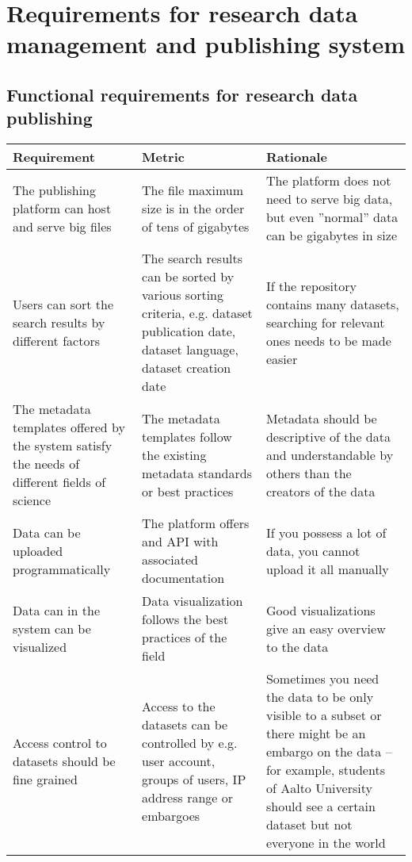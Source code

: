 \chapter{Requirements for research data management and publishing system}
\label{chapter:reqs}

\section{Functional requirements for research data publishing}

\tabcolsep=0.11cm
\begin{tabularx}{\textwidth}{| >{\raggedright}p{3cm} | >{\raggedright}p{3cm} | X |}
    \hline
    \textbf{Requirement} & \textbf{Metric}& \textbf{Rationale} \\
    \hline
    \rowcolor{Gray}
    The publishing platform can host and serve big files    &The file maximum size is in the order of tens of gigabytes & The platform does not need to serve big data, but even ''normal'' data can be gigabytes in size\\
    \hline
    Users can sort the search results by different factors &The search results can be sorted by various sorting criteria, e.g. dataset publication date, dataset language, dataset creation date & If the repository contains many datasets, searching for relevant ones needs to be made easier\\
    \hline
    \rowcolor{Gray}
    The metadata templates offered by the system satisfy the needs of different fields of science    &The metadata templates follow the existing metadata standards or best practices & Metadata should be descriptive of the data and understandable by others than the creators of the data\\
    \hline
    Data can be uploaded programmatically  &The platform offers and API with associated documentation  & If you possess a lot of data, you cannot upload it all manually\\
    \hline
    \rowcolor{Gray}
    Data can in the system can be visualized        &Data visualization follows the best practices of the field  & Good visualizations give an easy overview to the data\\
    \hline
    Access control to datasets should be fine grained  & Access to the datasets can be controlled by e.g. user account, groups of users, IP address range or embargoes & Sometimes you need the data to be only visible to a subset or there might be an embargo on the data – for example, students of Aalto University should see a certain dataset but not everyone in the world\\

\end{tabularx}
